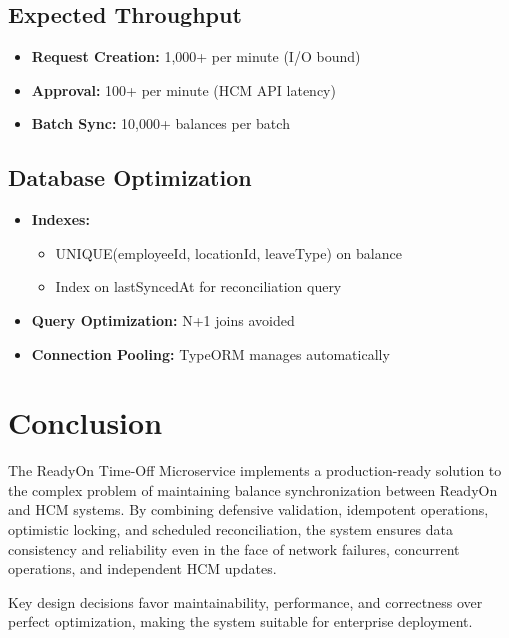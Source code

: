 \documentclass[12pt,a4paper]{article}
\begin{document}
\subsection{Expected Throughput}

\begin{itemize}
    \item \textbf{Request Creation:} 1,000+ per minute (I/O bound)
    \item \textbf{Approval:} 100+ per minute (HCM API latency)
    \item \textbf{Batch Sync:} 10,000+ balances per batch
\end{itemize}

\subsection{Database Optimization}

\begin{itemize}
    \item \textbf{Indexes:}
    \begin{itemize}
        \item UNIQUE(employeeId, locationId, leaveType) on balance
        \item Index on lastSyncedAt for reconciliation query
    \end{itemize}
    \item \textbf{Query Optimization:} N+1 joins avoided
    \item \textbf{Connection Pooling:} TypeORM manages automatically
\end{itemize}

\section{Conclusion}

The ReadyOn Time-Off Microservice implements a production-ready solution to the complex problem of maintaining balance synchronization between ReadyOn and HCM systems. By combining defensive validation, idempotent operations, optimistic locking, and scheduled reconciliation, the system ensures data consistency and reliability even in the face of network failures, concurrent operations, and independent HCM updates.

Key design decisions favor maintainability, performance, and correctness over perfect optimization, making the system suitable for enterprise deployment.
\end{document}
